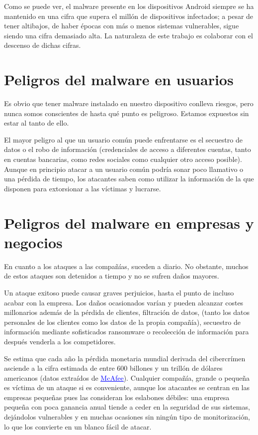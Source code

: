 Como se puede ver, el malware presente en los dispositivos Android siempre se ha mantenido en una cifra que supera el millón de dispositivos infectados; a pesar de tener altibajos, de haber épocas con más o menos sistemas vulnerables, sigue siendo una cifra demasiado alta. La naturaleza de este trabajo es colaborar con el descenso de dichas cifras.

\iffalse %
\section{Peligros del malware en usuarios}

Es obvio que tener malware instalado en nuestro dispositivo conlleva riesgos, pero nunca somos conscientes de hasta qué punto es peligroso. Estamos expuestos sin estar al tanto de ello.

El mayor peligro al que un usuario común puede enfrentarse es el secuestro de datos o el robo de información (credenciales de acceso a diferentes cuentas, tanto en cuentas bancarias, como redes sociales como cualquier otro acceso posible). Aunque en principio atacar a un usuario común podría sonar poco llamativo o una pérdida de tiempo, los atacantes saben como utilizar la información de la que disponen para extorsionar a las víctimas y lucrarse.


\section{Peligros del malware en empresas y negocios}

En cuanto a los ataques a las compañías, suceden a diario. No obstante, muchos de estos ataques son detenidos a tiempo y no se sufren daños mayores.

Un ataque exitoso puede causar graves perjuicios, hasta el punto de incluso acabar con la empresa. Los daños ocasionados varían y pueden alcanzar costes millonarios además de la pérdida de clientes, filtración de datos, (tanto los datos personales de los clientes como los datos de la propia compañía), secuestro de información mediante sofisticados ransomware o recolección de información para después venderla a los competidores.

Se estima que cada año la pérdida monetaria mundial derivada del cibercrímen asciende a la cifra estimada de entre 600 billones y un trillón de dólares americanos (datos extraídos de \href{https://www.mcafee.com/enterprise/en-us/solutions/lp/economics-cybercrime.html}{\textcolor{blue}{\underline{McAfee}}}). Cualquier compañía, grande o pequeña es víctima de un ataque si es conveniente, aunque los atacantes se centran en las empresas pequeñas pues las consideran los eslabones débiles: una empresa pequeña con poca ganancia anual tiende a ceder en la seguridad de sus sistemas, dejándolos vulnerables y en muchas ocasiones sin ningún tipo de monitorización, lo que los convierte en un blanco fácil de atacar.

